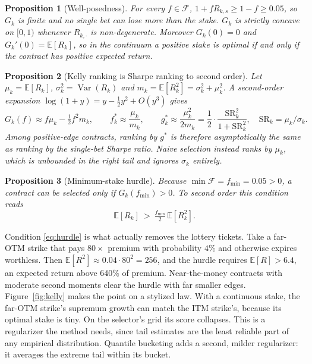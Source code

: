 \documentclass[11pt]{article}
\newtheorem{proposition}{Proposition}
\theoremstyle{definition}
\newcommand{\E}{\mathbb{E}}
\newcommand{\Var}{\operatorname{Var}}
\newcommand{\1}{\mathbf{1}}
\newcommand{\F}{\mathcal{F}}
\begin{document}
\begin{proposition}[Well-posedness]\label{prop:wellposed}
For every $f\in\F$, $1+fR_{k,s}\ge 1-f\ge 0.05$, so $G_k$ is finite and no single bet can
lose more than the stake. $G_k$ is strictly concave on $[0,1)$ whenever $R_{k,\cdot}$ is
non-degenerate. Moreover $G_k(0)=0$ and $G_k'(0)=\E[R_k]$, so in the continuum a positive
stake is optimal if and only if the contract has positive expected return.
\end{proposition}

\begin{proposition}[Kelly ranking is Sharpe ranking to second order]\label{prop:sharpe}
Let $\mu_k=\E[R_k]$, $\sigma_k^2=\Var(R_k)$ and $m_k=\E[R_k^2]=\sigma_k^2+\mu_k^2$.
A second-order expansion $\log(1+y)=y-\tfrac12y^2+O(y^3)$ gives
\begin{equation}
  G_k(f)\approx f\mu_k-\tfrac12 f^2 m_k,\qquad
  f^\ast_k\approx\frac{\mu_k}{m_k},\qquad
  g^\ast_k\approx\frac{\mu_k^2}{2m_k}=\frac12\cdot\frac{\mathrm{SR}_k^2}{1+\mathrm{SR}_k^2},
  \quad \mathrm{SR}_k=\mu_k/\sigma_k.
\end{equation}
Among positive-edge contracts, ranking by $g^\ast$ is therefore asymptotically the same as
ranking by the single-bet Sharpe ratio. Naive selection instead ranks by $\mu_k$, which is
unbounded in the right tail and ignores $\sigma_k$ entirely.
\end{proposition}

\begin{proposition}[Minimum-stake hurdle]\label{prop:hurdle}
Because $\min\F=f_{\min}=0.05>0$, a contract can be selected only if $G_k(f_{\min})>0$. To
second order this condition reads
\begin{equation}
  \E[R_k]\ >\ \tfrac{f_{\min}}{2}\,\E[R_k^2].
  \label{eq:hurdle}
\end{equation}
\end{proposition}
\noindent Condition \eqref{eq:hurdle} is what actually removes the lottery tickets. Take a
far-OTM strike that pays $80\times$ premium with probability $4\%$ and otherwise expires
worthless. Then $\E[R^2]\approx 0.04\cdot 80^2=256$, and the hurdle requires
$\E[R]>6.4$, an expected return above 640\% of premium. Near-the-money contracts with
moderate second moments clear the hurdle with far smaller edges.
Figure~\ref{fig:kelly} makes the point on a stylized law. With a continuous stake, the
far-OTM strike's supremum growth can match the ITM strike's, because its optimal stake is
tiny. On the selector's grid its score collapses. This is a regularizer the method needs,
since tail estimates are the least reliable part of any empirical distribution. Quantile
bucketing adds a second, milder regularizer: it averages the extreme tail within its
bucket.
\end{document}
